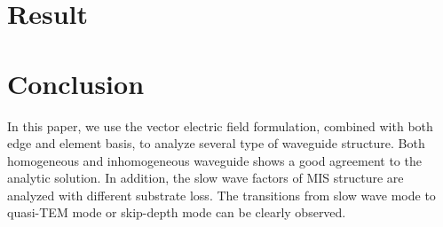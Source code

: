 \documentclass{pj}
\begin{document}
\section{Result}
\label{sec:result}







\section{Conclusion}
In this paper, we use the vector electric field formulation, combined with both edge and element basis, to analyze several type of waveguide structure. Both homogeneous and inhomogeneous  waveguide shows a good agreement to the analytic solution. In addition, the slow wave factors of MIS structure are analyzed with different substrate loss. The transitions from slow wave mode to quasi-TEM mode or skip-depth mode can be clearly observed. 


%
%

%
\end{document}
